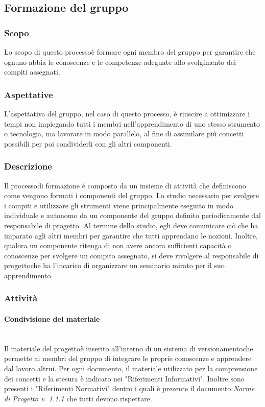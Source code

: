 	\subsection{Formazione del gruppo}
		\subsubsection{Scopo}
			Lo scopo di questo processo\glosp è formare ogni membro del gruppo per garantire che ognuno abbia le conoscenze e le competenze adeguate allo svolgimento dei compiti assegnati.
		\subsubsection{Aspettative}
			L'aspettativa del gruppo, nel caso di questo processo\glo, è riuscire a ottimizzare i tempi non impiegando tutti i membri nell'apprendimento di uno stesso strumento o tecnologia, ma lavorare in modo parallelo, al fine di assimilare più concetti possibili per poi condividerli con gli altri componenti.
		\subsubsection{Descrizione}
			Il processo\glosp di formazione è composto da un insieme di attività che definiscono come vengono formati i componenti del gruppo.
			Lo studio necessario per svolgere i compiti e utilizzare gli strumenti viene principalmente eseguito in modo individuale e autonomo da un componente del gruppo definito periodicamente dal responsabile di progetto\glo. Al termine dello studio, egli deve comunicare ciò che ha imparato agli altri membri per garantire che tutti apprendano le nozioni.
			Inoltre, qualora un componente ritenga di non avere ancora sufficienti capacità o conoscenze per svolgere un compito assegnato, si deve rivolgere al responsabile di progetto\glosp che ha l'incarico di organizzare un seminario mirato per il suo apprendimento.
		\subsubsection{Attività}
		\paragraph{Condivisione del materiale}\mbox{}\\ [1mm]
			Il materiale del progetto\glosp è inserito all'interno di un sistema di versionamento\glosp che permette ai membri del gruppo di integrare le proprie conoscenze e apprendere dal lavoro altrui.
			Per ogni documento, il materiale utilizzato per la comprensione dei concetti e la stesura è indicato nei "Riferimenti Informativi".
			Inoltre sono presenti i "Riferimenti Normativi" dentro i quali è presente il documento \textit{Norme di Progetto v. 1.1.1} che tutti devono rispettare.
